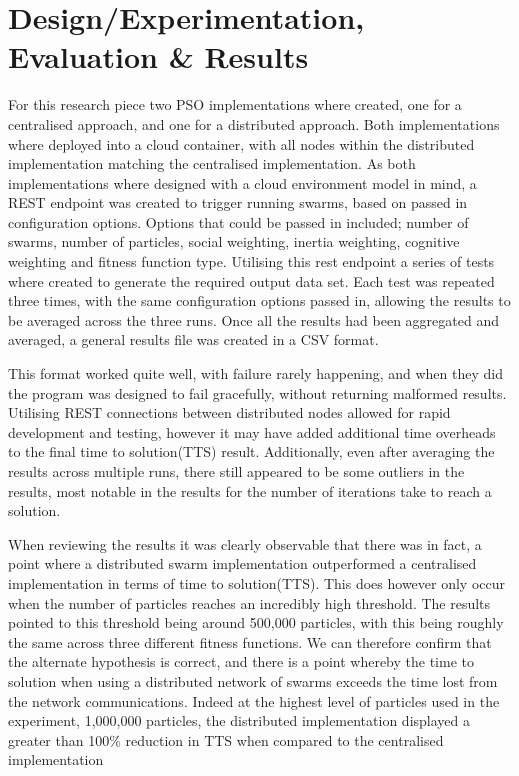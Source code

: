 \documentclass[oneside,12pt]{book}
\begin{document}
\section{Design/Experimentation, Evaluation \& Results}
For this research piece two PSO implementations where created, one for a centralised approach, and one for a distributed approach. Both implementations where deployed into a cloud container, with all nodes within the distributed implementation matching the centralised implementation. As both implementations where designed with a cloud environment model in mind, a REST endpoint was created to trigger running swarms, based on passed in configuration options. Options that could be passed in included; number of swarms, number of particles, social weighting, inertia weighting, cognitive weighting and fitness function type. Utilising this rest endpoint a series of tests where created to generate the required output data set. Each test was repeated three times, with the same configuration options passed in, allowing the results to be averaged across the three runs. 
Once all the results had been aggregated and averaged, a general results file was created in a CSV format. 

This format worked quite well, with failure rarely happening, and when they did the program was designed to fail gracefully, without returning malformed results. Utilising REST connections between distributed nodes allowed for rapid development and testing, however it may have added additional time overheads to the final time to solution(TTS) result. Additionally, even after averaging the results across multiple runs, there still appeared to be some outliers in the results, most notable in the results for the number of iterations take to reach a solution. 

When reviewing the results it was clearly observable that there was in fact, a point where a distributed swarm implementation outperformed a centralised implementation in terms of time to solution(TTS). This does however only occur when the number of particles reaches an incredibly high threshold. The results pointed to this threshold being around 500,000 particles, with this being roughly the same across three different fitness functions. We can therefore confirm that the alternate hypothesis is correct, and there is a point whereby the time to solution when using a distributed network of swarms exceeds the time lost from the network communications. Indeed at the highest level of particles used in the experiment, 1,000,000 particles, the distributed implementation displayed a greater than 100\% reduction in TTS when compared to the centralised implementation
\end{document}
